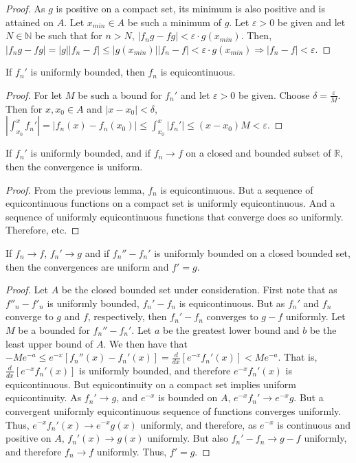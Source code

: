         \begin{proof}
            As $g$ is positive on a compact set, its minimum is also positive and is attained on $A$. Let $x_{min}\in A$ be such a minimum of $g$. Let $\varepsilon>0$ be given and let $N\in \mathbb{N}$ be such that for $n>N$, $|f_ng-fg|<\varepsilon\cdot g(x_{min})$. Then, $|f_ng-fg|=|g||f_n-f|\leq |g(x_{min})||f_n-f|<\varepsilon \cdot g(x_{min})\Rightarrow |f_n-f|<\varepsilon$.
        \end{proof}
        \begin{theorem}
            If $f_n'$ is uniformly bounded, then $f_n$ is equicontinuous.
        \end{theorem}
        \begin{proof}
            For let $M$ be such a bound for $f_n'$ and let $\varepsilon>0$ be given. Choose $\delta = \frac{\varepsilon}{M}$. Then for $x,x_0\in A$ and $|x-x_0|<\delta$, $|\int_{x_0}^{x}f_n'| =|f_n(x)-f_n(x_0)| \leq \int_{x_0}^{x}|f_n'| \leq (x-x_0)M < \varepsilon$.
        \end{proof}
        \begin{theorem}
            If $f_n'$ is uniformly bounded, and if $f_n \rightarrow f$ on a closed and bounded subset of $\mathbb{R}$, then the convergence is uniform.
        \end{theorem}
        \begin{proof}
            From the previous lemma, $f_n$ is equicontinuous. But a sequence of equicontinuous functions on a compact set is uniformly equicontinuous. And a sequence of uniformly equicontinuous functions that converge does so uniformly. Therefore, etc.
        \end{proof}
        \begin{theorem}
            If $f_n \rightarrow f$, $f_n'\rightarrow g$ and if $f_n''-f_n'$ is uniformly bounded on a closed bounded set, then the convergences are uniform and $f' = g$.
        \end{theorem}
        \begin{proof}
            Let $A$ be the closed bounded set under consideration. First note that as $f''_n - f'_n$ is uniformly bounded, $f_n'-f_n$ is equicontinuous. But as $f_n'$ and $f_n$ converge to $g$ and $f$, respectively, then $f_n'-f_n$ converges to $g-f$ uniformly. Let $M$ be a bounded for $f_n''-f_n'$. Let $a$ be the greatest lower bound and $b$ be the least upper bound of $A$. We then have that $-Me^{-a}\leq e^{-x}[f_n''(x)-f_n'(x)]=\frac{d}{dx}[e^{-x}f_n'(x)] < Me^{-a}$. That is, $\frac{d}{dx}[e^{-x}f_n'(x)]$ is uniformly bounded, and therefore $e^{-x}f_n'(x)$ is equicontinuous. But equicontinuity on a compact set implies uniform equicontinuity. As $f_n'\rightarrow g$, and $e^{-x}$ is bounded on $A$, $e^{-x}f_n'\rightarrow e^{-x}g$. But a convergent uniformly equicontinuous sequence of functions converges uniformly. Thus, $e^{-x}f_n'(x) \rightarrow e^{-x}g(x)$ uniformly, and therefore, as $e^{-x}$ is continuous and positive on $A$, $f_n'(x)\rightarrow g(x)$ uniformly. But also $f_n'-f_n \rightarrow g-f$ uniformly, and therefore $f_n \rightarrow f$ uniformly. Thus, $f'=g$.
        \end{proof}
